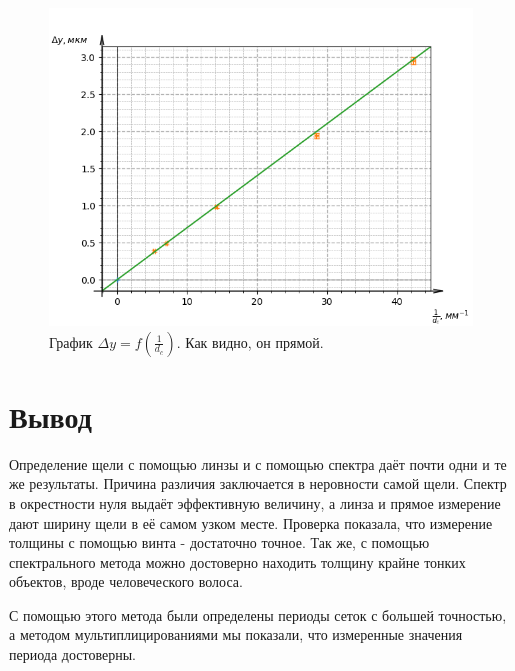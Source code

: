 \documentclass[a4paper, 14pt]{extarticle}%
\newcommand\ECaption[1]{%
     \captionsetup{font=footnotesize}%
     \caption{#1}}
\begin{document}
\begin{figure}[h!]
\begin{center}
\includegraphics[width=1\textwidth]{gr3}
\ECaption{ График $ \Delta y = f(\frac{1}{d_c}) $. Как видно, он прямой. }
\end{center}
\end{figure}


\section*{Вывод}

Определение щели с помощью линзы и с помощью спектра даёт почти одни и те же результаты. Причина различия заключается в неровности самой щели. Спектр в окрестности нуля выдаёт эффективную величину, а линза и прямое измерение дают ширину щели в её самом узком месте. Проверка показала, что измерение толщины с помощью винта - достаточно точное. Так же, с помощью спектрального метода можно достоверно находить толщину крайне тонких объектов, вроде человеческого волоса.

 С помощью этого метода были определены периоды сеток с большей точностью, а методом мультиплицированиями мы показали, что измеренные значения периода достоверны.
\end{document}

